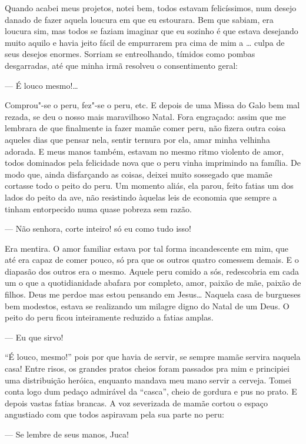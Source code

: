 Quando acabei meus projetos, notei bem, todos estavam felicíssimos, num
desejo danado de fazer aquela loucura em que eu estourara. Bem que
sabiam, era loucura sim, mas todos se faziam imaginar que eu sozinho é
que estava desejando muito aquilo e havia jeito fácil de empurrarem pra
cima de mim a \ldots{} culpa de seus desejos enormes. Sorriam se
entreolhando, tímidos como pombas desgarradas, até que minha irmã
resolveu o consentimento geral:

--- É louco mesmo!\ldots{}

Comprou"-se o peru, fez"-se o peru, etc. E depois de uma Missa do Galo bem
mal rezada, se deu o nosso mais maravilhoso Natal. Fora engraçado: assim
que me lembrara de que finalmente ia fazer mamãe comer peru, não fizera
outra coisa aqueles dias que pensar nela, sentir ternura por ela, amar
minha velhinha adorada. E meus manos também, estavam no mesmo ritmo
violento de amor, todos dominados pela felicidade nova que o peru vinha
imprimindo na família. De modo que, ainda disfarçando as coisas, deixei
muito sossegado que mamãe cortasse todo o peito do peru. Um momento
aliás, ela parou, feito fatias um dos lados do peito da ave, não
resistindo àquelas leis de economia que sempre a tinham entorpecido numa
quase pobreza sem razão.

--- Não senhora, corte inteiro! só eu como tudo isso!

Era mentira. O amor familiar estava por tal forma incandescente em mim,
que até era capaz de comer pouco, só pra que os outros quatro comessem
demais. E o diapasão dos outros era o mesmo. Aquele peru comido a sós,
redescobria em cada um o que a quotidianidade abafara por completo,
amor, paixão de mãe, paixão de filhos. Deus me perdoe mas estou pensando
em Jesus\ldots{} Naquela casa de burgueses bem modestos, estava se realizando
um milagre digno do Natal de um Deus. O peito do peru ficou inteiramente
reduzido a fatias amplas.

--- Eu que sirvo!

``É louco, mesmo!'' pois por que havia de servir, se sempre mamãe
servira naquela casa! Entre risos, os grandes pratos cheios foram
passados pra mim e principiei uma distribuição heróica, enquanto mandava
meu mano servir a cerveja. Tomei conta logo dum pedaço admirável da
``casca'', cheio de gordura e pus no prato. E depois vastas fatias
brancas. A voz severizada de mamãe cortou o espaço angustiado com que
todos aspiravam pela sua parte no peru:

--- Se lembre de seus manos, Juca!

